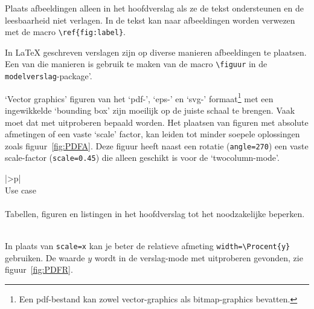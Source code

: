 Plaats afbeeldingen alleen in het hoofdverslag als ze de tekst
ondersteunen en de leesbaarheid niet verlagen.  In de tekst kan naar
afbeeldingen worden verwezen met de macro \verb!\ref{fig:label}!.

In \LaTeX{}\cite{lam1994} geschreven verslagen zijn op diverse manieren
afbeeldingen\cite{Oos1996} te plaatsen. Een van die manieren is gebruik te
maken van de macro \verb!\figuur! in de \verb!modelverslag!-package'.

`Vector graphics' figuren van het `pdf-', `eps-' en `svg-'
formaat\footnote{Een pdf-bestand kan zowel vector-graphics als
	bitmap-graphics bevatten.} met een ingewikkelde `bounding box' zijn
moeilijk op de juiste schaal te brengen. Vaak moet dat met uitproberen
bepaald worden. Het plaatsen van figuren met absolute afmetingen of
een vaste `scale' factor, kan leiden tot minder soepele oplossingen
zoals figuur~\ref{fig:PDFA}. Deze figuur heeft naast een rotatie
(\verb!angle=270!)  een vaste scale-factor (\verb!scale=0.45!) die
alleen geschikt is voor de `twocolumn-mode'.



\begin{center}
	\begin{tabular}{|>\C p{}|}
		\hline
		~\\
		Use case\\
		~\\
		Tabellen, figuren en listingen in het hoofdverslag tot het
		noodzakelijke beperken.\\
		~\\
		\hline
	\end{tabular}
\end{center}




\begin{center}
	
\end{center}



In plaats van \verb!scale=x! kan je beter de relatieve afmeting
\verb!width=\Procent{y}! gebruiken. De waarde $y$ wordt in de
verslag-mode met uitproberen gevonden, zie figuur~\ref{fig:PDFR}.

\begin{center}
	
\end{center}


